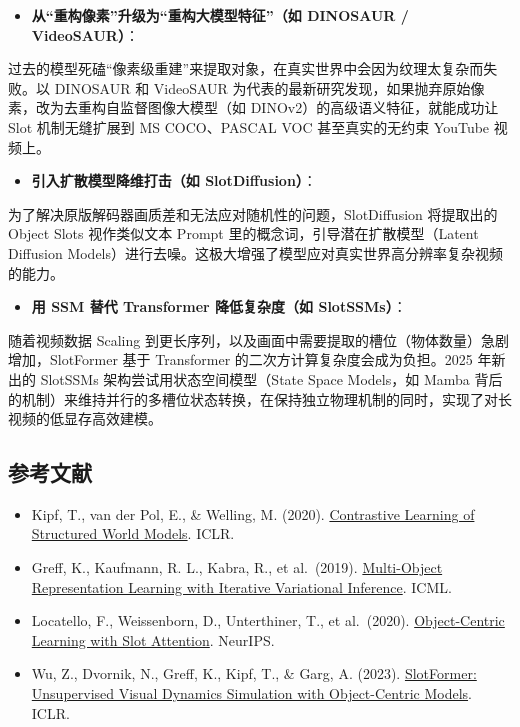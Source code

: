 \begin{itemize}
\tightlist
\item
  \textbf{从``重构像素''升级为``重构大模型特征''（如 DINOSAUR / VideoSAUR）}：
\end{itemize}

过去的模型死磕``像素级重建''来提取对象，在真实世界中会因为纹理太复杂而失败。以 DINOSAUR 和 VideoSAUR 为代表的最新研究发现，如果抛弃原始像素，改为去重构自监督图像大模型（如 DINOv2）的高级语义特征，就能成功让 Slot 机制无缝扩展到 MS COCO、PASCAL VOC 甚至真实的无约束 YouTube 视频上。

\begin{itemize}
\tightlist
\item
  \textbf{引入扩散模型降维打击（如 SlotDiffusion）}：
\end{itemize}

为了解决原版解码器画质差和无法应对随机性的问题，SlotDiffusion 将提取出的 Object Slots 视作类似文本 Prompt 里的概念词，引导潜在扩散模型（Latent Diffusion Models）进行去噪。这极大增强了模型应对真实世界高分辨率复杂视频的能力。

\begin{itemize}
\tightlist
\item
  \textbf{用 SSM 替代 Transformer 降低复杂度（如 SlotSSMs）}：
\end{itemize}

随着视频数据 Scaling 到更长序列，以及画面中需要提取的槽位（物体数量）急剧增加，SlotFormer 基于 Transformer 的二次方计算复杂度会成为负担。2025 年新出的 SlotSSMs 架构尝试用状态空间模型（State Space Models，如 Mamba 背后的机制）来维持并行的多槽位状态转换，在保持独立物理机制的同时，实现了对长视频的低显存高效建模。

\hypertarget{ux53c2ux8003ux6587ux732e-185}{%
\subsection{参考文献}\label{ux53c2ux8003ux6587ux732e-185}}

\begin{itemize}
\tightlist
\item
  Kipf, T., van der Pol, E., \& Welling, M. (2020). \href{https://arxiv.org/abs/1911.12247}{Contrastive Learning of Structured World Models}. ICLR.
\item
  Greff, K., Kaufmann, R. L., Kabra, R., et al.~(2019). \href{https://arxiv.org/abs/1903.00450}{Multi-Object Representation Learning with Iterative Variational Inference}. ICML.
\item
  Locatello, F., Weissenborn, D., Unterthiner, T., et al.~(2020). \href{https://arxiv.org/abs/2006.15055}{Object-Centric Learning with Slot Attention}. NeurIPS.
\item
  Wu, Z., Dvornik, N., Greff, K., Kipf, T., \& Garg, A. (2023). \href{https://arxiv.org/abs/2210.05861}{SlotFormer: Unsupervised Visual Dynamics Simulation with Object-Centric Models}. ICLR.
\end{itemize}

\clearpage
